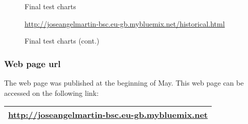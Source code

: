 \begin{figure}[htb]
	\centering
	\caption{Final test charts}
	\label{fig:6-RealTime}
\end{figure}

\begin{figure}[htb]\ContinuedFloat
	\centering
	\caption{Final test charts (cont.)}
	\label{fig:6-RealTime}{\url{http://joseangelmartin-bsc.eu-gb.mybluemix.net/historical.html}}
\end{figure}

\subsubsection{Web page url}
The web page was published at the beginning of May. This web page can be accessed on the following link:
\begin{center}
	\begin{tabular}{|>{\columncolor[HTML]{C0C0C0}}l |}
		\hline
		\url{http://joseangelmartin-bsc.eu-gb.mybluemix.net}\\
		\hline
	\end{tabular}
\end{center}

